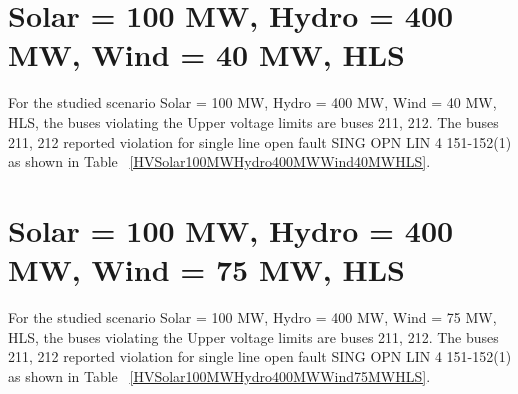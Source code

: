\documentclass[10pt]{report}
\begin{document}
\section{Solar = 100 MW, Hydro = 400 MW, Wind = 40 MW, HLS}
For the studied scenario Solar = 100 MW, Hydro = 400 MW, Wind = 40 MW, HLS, the buses violating the Upper voltage limits are buses 211, 212.
The buses 211, 212 reported violation for single line open fault SING OPN LIN   4 151-152(1) as shown in Table ~\ref{HVSolar100MWHydro400MWWind40MWHLS}.
\begin{table}[H]
\caption{Contingencies reporting bus voltages greater than emergency voltage of 1.1 PU for scenario Solar = 100 MW, Hydro = 400 MW, Wind = 40 MW, HLS}
\label{HVSolar100MWHydro400MWWind40MWHLS}
\centering
{}
\end{table}


\section{Solar = 100 MW, Hydro = 400 MW, Wind = 75 MW, HLS}
For the studied scenario Solar = 100 MW, Hydro = 400 MW, Wind = 75 MW, HLS, the buses violating the Upper voltage limits are buses 211, 212.
The buses 211, 212 reported violation for single line open fault SING OPN LIN   4 151-152(1) as shown in Table ~\ref{HVSolar100MWHydro400MWWind75MWHLS}.
\begin{table}[H]
\caption{Contingencies reporting bus voltages greater than emergency voltage of 1.1 PU for scenario Solar = 100 MW, Hydro = 400 MW, Wind = 75 MW, HLS}
\label{HVSolar100MWHydro400MWWind75MWHLS}
\centering
{}
\end{table}
\end{document}
